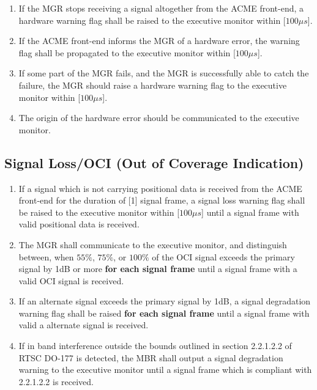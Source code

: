 \documentclass[11pt]{article}
\begin{document}
			\begin{enumerate}

				\item If the MGR stops receiving a signal altogether from the ACME front-end, a hardware warning flag shall be raised to the executive monitor within [$100\mu s$].   

				\item If the ACME front-end informs the MGR of a hardware error, the warning flag shall be propagated to the executive monitor within [$100\mu s$].

				\item If some part of the MGR fails, and the MGR is successfully able to catch the failure, the MGR should raise a hardware warning flag to the executive monitor within [$100\mu s$].

				\item The origin of the hardware error should be communicated to the executive monitor.

			\end{enumerate}

		\subsection{Signal Loss/OCI (Out of Coverage Indication)} \label{signal warning}

			\begin{enumerate}

				\item If a signal which is not carrying positional data is received from the ACME front-end for the duration of [1] signal frame, a signal loss warning flag shall be raised to the executive monitor within [$100\mu s$] until a signal frame with valid positional data is received.

				\item \label{OCI} The MGR shall communicate to the executive monitor, and distinguish between, when $55\%$, $75\%$, or $100\%$ of the OCI signal exceeds the primary signal by 1dB or more \textbf{for each signal frame} until a signal frame with a valid OCI signal is received.

				\item \label{alternative} If an alternate signal exceeds the primary signal by 1dB, a signal degradation warning flag shall be raised \textbf{for each signal frame} until a signal frame with valid a alternate signal is received.

				\item If in band interference outside the bounds outlined in section 2.2.1.2.2 of RTSC DO-177 is detected, the MBR shall output a signal degradation warning to the executive monitor until a signal frame which is compliant with 2.2.1.2.2 is received.

			\end{enumerate}
\end{document}

